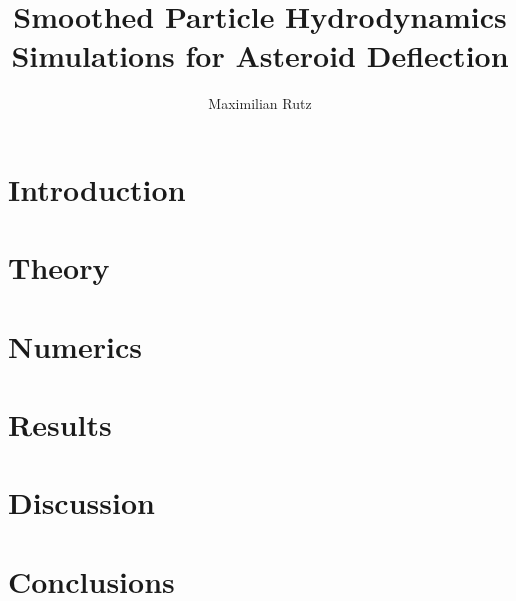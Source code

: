 \documentclass{article}
\title{Smoothed Particle Hydrodynamics Simulations for Asteroid Deflection}
\author{Maximilian Rutz}
\date{}
\begin{document}
\maketitle
\begin{abstract}
   
\end{abstract}

\newpage
\tableofcontents

\newpage
\section{Introduction}

\section{Theory}

\section{Numerics}

\section{Results}

\section{Discussion}

\section{Conclusions}


\newpage
\printbibliography
\end{document}
